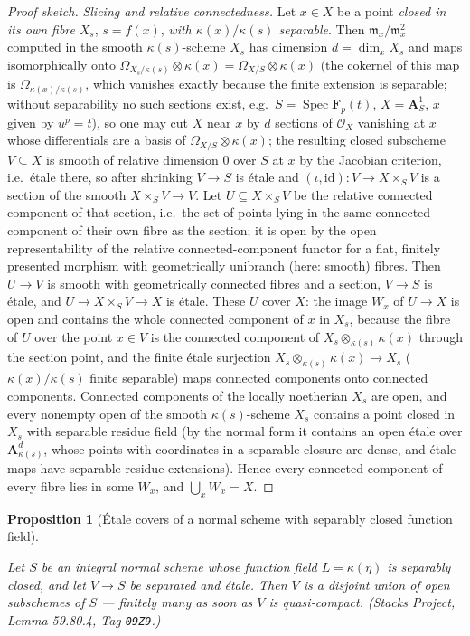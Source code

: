\documentclass[11pt]{article}
\makeatletter
\theoremstyle{plain}
\newtheorem{proposition}[theorem]{Proposition}
\theoremstyle{definition}
\newcommand{\Aaf}{\mathbf A}
\DeclareMathOperator{\Spec}{Spec}
\newcommand{\up}[1]{%
  \ifcsname r@#1\endcsname
    \hyperref[#1]{\texttt{\scriptsize #1}}%
  \else
    \texttt{\scriptsize #1}%
  \fi}
\newcommand{\uses}[1]{\par\smallskip\noindent{\footnotesize\textit{Uses:}\ #1\par}\smallskip}
\makeatother
\begin{document}
\begin{proof}[Proof sketch]
\emph{Slicing and relative connectedness.}  Let $x\in X$ be a point
\emph{closed in its own fibre} $X_s$, $s=f(x)$, \emph{with
$\kappa(x)/\kappa(s)$ separable}.  Then
$\mathfrak m_x/\mathfrak m_x^2$ computed in the smooth
$\kappa(s)$-scheme $X_s$ has dimension $d=\dim_xX_s$ and maps
isomorphically onto
$\Omega_{X_s/\kappa(s)}\otimes\kappa(x)=\Omega_{X/S}\otimes\kappa(x)$
(the cokernel of this map is $\Omega_{\kappa(x)/\kappa(s)}$, which
vanishes exactly because the finite extension is separable; without
separability no such sections exist, e.g.\ $S=\Spec\mathbf F_p(t)$,
$X=\Aaf^1_S$, $x$ given by $u^p=t$), so one may cut
$X$ near $x$ by $d$ sections of $\mathcal O_X$ vanishing at $x$ whose
differentials are a basis of $\Omega_{X/S}\otimes\kappa(x)$; the
resulting closed subscheme
$V\subseteq X$ is smooth of relative dimension $0$ over $S$ at $x$ by
the Jacobian
criterion, i.e.\ \'etale there, so after shrinking $V\to S$ is
\'etale and $(\iota,\mathrm{id}):V\to X\times_SV$ is a section of the
smooth $X\times_SV\to V$.  Let $U\subseteq X\times_SV$ be the
relative connected component of that section, i.e.\ the set of points
lying in the same connected component of their own fibre as the
section; it is open by the open representability of the relative
connected-component functor for a flat, finitely presented morphism
with geometrically unibranch (here:  smooth) fibres.  Then $U\to V$
is smooth with geometrically connected fibres and a section, $V\to S$
is \'etale, and $U\to X\times_SV\to X$ is \'etale.  These $U$ cover
$X$:  the image $W_x$ of $U\to X$ is open and contains the whole
connected component of $x$ in $X_s$, because the fibre of $U$ over
the point $x\in V$ is the connected component of
$X_s\otimes_{\kappa(s)}\kappa(x)$ through the section point, and the
finite \'etale surjection $X_s\otimes_{\kappa(s)}\kappa(x)\to X_s$
($\kappa(x)/\kappa(s)$ finite separable) maps connected components
onto connected components.  Connected components of the locally
noetherian $X_s$ are open, and every nonempty open of the smooth
$\kappa(s)$-scheme $X_s$ contains a point closed in $X_s$ with
separable residue field (by the normal form it contains an open
\'etale over $\Aaf^d_{\kappa(s)}$, whose points with coordinates in a
separable closure are dense, and \'etale maps have separable residue
extensions).  Hence every connected component of every fibre lies in
some $W_x$, and $\bigcup_xW_x=X$.
\end{proof}

\begin{proposition}[\'Etale covers of a normal scheme with separably
closed function field]
\label{prop:etale-normal}
\uses{\up{def:smooth}}
Let $S$ be an integral normal scheme whose function field
$L=\kappa(\eta)$ is separably closed, and let $V\to S$ be separated
and \'etale.  Then $V$ is a disjoint union of open subschemes of $S$
--- finitely many as soon as $V$ is quasi-compact.
(Stacks Project, Lemma 59.80.4, Tag \texttt{09Z9}.)
\end{proposition}
\end{document}
